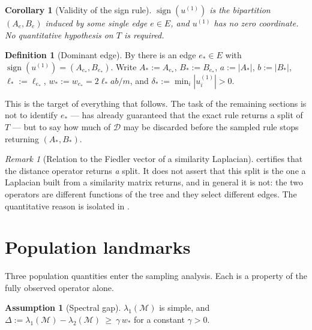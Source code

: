 \documentclass[11pt]{article}
\theoremstyle{plain}
\newtheorem{corollary}{Corollary}
\theoremstyle{definition}
\newtheorem{definition}{Definition}
\newtheorem{assumption}{Assumption}
\theoremstyle{remark}
\newtheorem{remark}{Remark}
\providecommand{\Dmat}{\mathcal{D}}          %
\providecommand{\Mop}{\mathcal{M}}           %
\providecommand{\uone}{u^{(1)}}
\providecommand{\1}{\mathbf{1}}
\newcommand{\est}{e_{*}}
\newcommand{\wst}{w_{*}}
\newcommand{\Ast}{A_{*}}
\newcommand{\Bst}{B_{*}}
\begin{document}
\begin{corollary}[Validity of the sign rule]\label{d:cor:validity}
$\operatorname{sign}(\uone)$ is the bipartition $(A_{e},B_{e})$ induced by some
single edge $e\in E$, and $\uone$ has no zero coordinate. No quantitative
hypothesis on $T$ is required.
\end{corollary}

\begin{definition}[Dominant edge]\label{d:def:dominant}
By  there is an edge $\est\in E$ with
$\operatorname{sign}(\uone)=(A_{\est},B_{\est})$. Write
$\Ast:=A_{\est}$, $\Bst:=B_{\est}$, $a:=|\Ast|$, $b:=|\Bst|$,
$\ell_*:=\ell_{\est}$, $\wst:=w_{\est}=2\ell_*ab/m$, and
$\delta_*:=\min_i|\uone_i|>0$.
\end{definition}

This is the target of everything that follows. The task of the remaining
sections is not to identify $\est$ ---  has already
guaranteed that the exact rule returns a split of $T$ --- but to say how much of
$\Dmat$ may be discarded before the sampled rule stops returning
$(\Ast,\Bst)$.

\begin{remark}[Relation to the Fiedler vector of a similarity Laplacian]
\label{d:rem:notthesame}
 certifies that the distance operator returns \emph{a}
split. It does not assert that this split is the one a Laplacian built from a
similarity matrix returns, and in general it is not: the two operators are
different functions of the tree and they select different edges. The
quantitative reason is isolated in .
\end{remark}

\section{Population landmarks}\label{d:sec:landmarks}

Three population quantities enter the sampling analysis. Each is a property of
the fully observed operator alone.

\begin{assumption}[Spectral gap]\label{d:asm:gap}
$\lambda_1(\Mop)$ is simple, and
$\Delta:=\lambda_1(\Mop)-\lambda_2(\Mop)\ \ge\ \gamma\,\wst$
for a constant $\gamma>0$.
\end{assumption}
\end{document}
